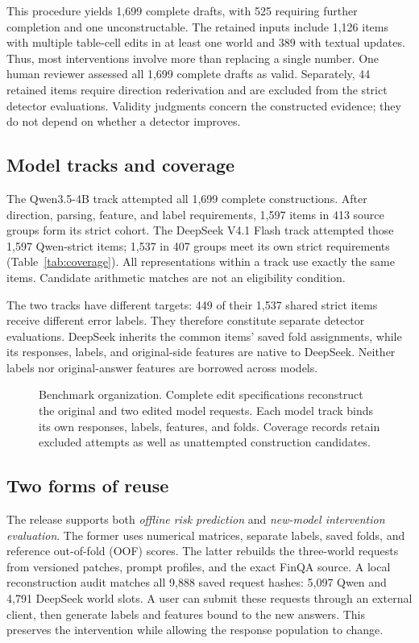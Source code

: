This procedure yields 1,699 complete drafts, with 525 requiring further completion and one unconstructable. The retained inputs include 1,126 items with multiple table-cell edits in at least one world and 389 with textual updates. Thus, most interventions involve more than replacing a single number. One human reviewer assessed all 1,699 complete drafts as valid. Separately, 44 retained items require direction rederivation and are excluded from the strict detector evaluations. Validity judgments concern the constructed evidence; they do not depend on whether a detector improves.

\subsection{Model tracks and coverage}

The Qwen3.5-4B track attempted all 1,699 complete constructions. After direction, parsing, feature, and label requirements, 1,597 items in 413 source groups form its strict cohort. The DeepSeek V4.1 Flash track attempted those 1,597 Qwen-strict items; 1,537 in 407 groups meet its own strict requirements (Table~\ref{tab:coverage}). All representations within a track use exactly the same items. Candidate arithmetic matches are not an eligibility condition.

The two tracks have different targets: 449 of their 1,537 shared strict items receive different error labels. They therefore constitute separate detector evaluations. DeepSeek inherits the common items' saved fold assignments, while its responses, labels, and original-side features are native to DeepSeek. Neither labels nor original-answer features are borrowed across models.

\begin{figure}[t]
\centering
{}
\caption{Benchmark organization. Complete edit specifications reconstruct the original and two edited model requests. Each model track binds its own responses, labels, features, and folds. Coverage records retain excluded attempts as well as unattempted construction candidates.}
\label{fig:benchmark-coverage}
\end{figure}

\subsection{Two forms of reuse}
The release supports both \emph{offline risk prediction} and \emph{new-model intervention evaluation}. The former uses numerical matrices, separate labels, saved folds, and reference out-of-fold (OOF) scores. The latter rebuilds the three-world requests from versioned patches, prompt profiles, and the exact FinQA source. A local reconstruction audit matches all 9,888 saved request hashes: 5,097 Qwen and 4,791 DeepSeek world slots. A user can submit these requests through an external client, then generate labels and features bound to the new answers. This preserves the intervention while allowing the response population to change.

